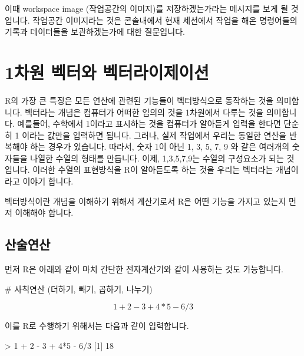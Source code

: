 \documentclass{book}
\begin{document}
이때 workspace image (작업공간의 이미지)를 저장하겠는가라는 메시지를 보게 될 것입니다. 
작업공간 이미지라는 것은 콘솔내에서 현재 세션에서 작업을 해온 명령어들의 기록과 데이터들을 보관하겠는가에 대한 질문입니다. 


\section{1차원 벡터와 벡터라이제이션}

R의 가장 큰 특징은 모든 연산에 관련된 기능들이 벡터방식으로 동작하는 것을 의미합니다. 
벡터라는 개념은 컴퓨터가 어떠한 임의의 것을 1차원에서 다루는 것을 의미합니다.
예를들어, 수학에서 1이라고 표시하는 것을 컴퓨터가 알아듣게 입력을 한다면 단순히 1 이라는 값만을 입력하면 됩니다. 
그러나, 실제 작업에서 우리는 동일한 연산을 반복해야 하는 경우가 있습니다. 
따라서, 숫자 1이 아닌 1, 3, 5, 7, 9 와 같은 여러개의 숫자들을 나열한 수열의 형태를 만듭니다. 
이제, 1,3,5,7,9는 수열의 구성요소가 되는 것입니다. 
이러한 수열의 표현방식을 R이 알아듣도록 하는 것을 우리는 벡터라는 개념이라고 이야기 합니다. 

벡터방식이란 개념을 이해하기 위해서 계산기로서 R은 어떤 기능을 가지고 있는지 먼저 이해해야 합니다.

\subsection{산술연산}

먼저 R은 아래와 같이 마치 간단한 전자계산기와 같이 사용하는 것도 가능합니다.

\begin{Schunk}
	\begin{Soutput}
# 사칙연산 (더하기, 빼기, 곱하기, 나누기)
	\end{Soutput}
\end{Schunk}

\begin{equation}
1 + 2 - 3 + 4*5 - 6/3
\end{equation}

이를 R로 수행하기 위해서는 다음과 같이 입력합니다. 

\begin{Schunk}
	\begin{Soutput}
> 1 + 2 - 3 + 4*5 - 6/3
[1] 18
	\end{Soutput}
\end{Schunk}
\end{document}

